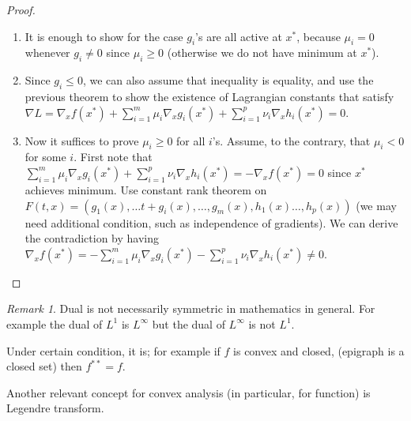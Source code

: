 \documentclass[11pt,reqno]{amsart}
\theoremstyle{remark}
\newtheorem{remark}[example]{Remark}
\begin{document}
\begin{proof}
\begin{enumerate}
\item It is enough to show for the case $g_i$'s are all active at $x^*$, because
 $\mu_i=0$ whenever $g_i\neq 0$ since $\mu_i\geq 0$ (otherwise we do not have minimum at $x^*$).
\item Since $g_i\leq 0$, we can also assume that inequality is equality, 
and use the previous theorem to show the existence of Lagrangian constants that satisfy $\nabla L=\nabla_x f(x^*)+\sum^m_{i=1}\mu_i\nabla_x g_i(x^*)+\sum^p_{i=1}\nu_i\nabla_x h_i(x^*)=0$.
\item Now it suffices to prove $\mu_i\geq 0$ for all $i$'s. Assume, to the contrary, that $\mu_i<0$ for some $i$.
First note that $\sum^m_{i=1}\mu_i\nabla_x g_i(x^*)+\sum^p_{i=1}\nu_i\nabla_x h_i(x^*)=-\nabla_x f(x^*)=0$ since $x^*$ achieves minimum. 
Use constant rank theorem on $F(t,x)=(g_1(x),\dots t+g_i(x),\dots, g_m(x),h_1(x)\dots,h_p(x))$ (we may need additional condition, such as independence of gradients). 
We can derive the contradiction by having $\nabla_x f(x^*)=-\sum^m_{i=1}\mu_i\nabla_xg_i(x^*)-\sum^p_{i=1}\nu_i\nabla_x h_i(x^*)\neq 0$.
\end{enumerate}
\end{proof}
\begin{remark}
\item Dual is not necessarily symmetric in mathematics in general. For example the dual of $L^1$ is $L^\infty$ but the dual of $L^\infty$ is not $L^1$.
\item Under certain condition, it is; for example if $f$ is convex and closed, (epigraph is a closed set) then $f^{**}=f$.
\item Another relevant concept for convex analysis (in particular, for function) is Legendre transform.
\end{remark}
\end{document}
